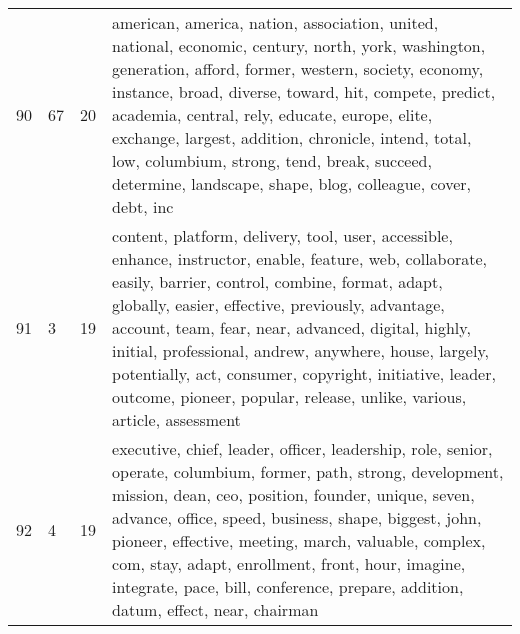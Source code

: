 \begin{table}[ht]
{\begin{tabularx}{\textwidth}{llrX}
   90 & 67 & 20 & american, america, nation, association, united, national, economic, century, north, york, washington, generation, afford, former, western, society, economy, instance, broad, diverse, toward, hit, compete, predict, academia, central, rely, educate, europe, elite, exchange, largest, addition, chronicle, intend, total, low, columbium, strong, tend, break, succeed, determine, landscape, shape, blog, colleague, cover, debt, inc \\ 
   91 & 3 & 19 & content, platform, delivery, tool, user, accessible, enhance, instructor, enable, feature, web, collaborate, easily, barrier, control, combine, format, adapt, globally, easier, effective, previously, advantage, account, team, fear, near, advanced, digital, highly, initial, professional, andrew, anywhere, house, largely, potentially, act, consumer, copyright, initiative, leader, outcome, pioneer, popular, release, unlike, various, article, assessment \\ 
   92 & 4 & 19 & executive, chief, leader, officer, leadership, role, senior, operate, columbium, former, path, strong, development, mission, dean, ceo, position, founder, unique, seven, advance, office, speed, business, shape, biggest, john, pioneer, effective, meeting, march, valuable, complex, com, stay, adapt, enrollment, front, hour, imagine, integrate, pace, bill, conference, prepare, addition, datum, effect, near, chairman \\ 
   \bottomrule
\end{tabularx}
}
\end{table}
